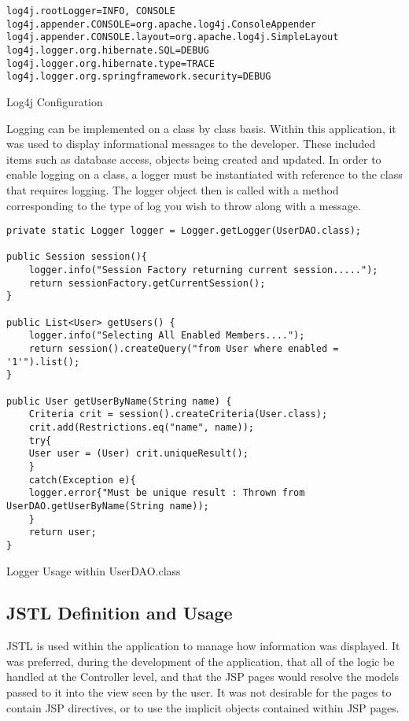 \begin{table}[H]
\begin{lstlisting}
log4j.rootLogger=INFO, CONSOLE
log4j.appender.CONSOLE=org.apache.log4j.ConsoleAppender
log4j.appender.CONSOLE.layout=org.apache.log4j.SimpleLayout
log4j.logger.org.hibernate.SQL=DEBUG
log4j.logger.org.hibernate.type=TRACE
log4j.logger.org.springframework.security=DEBUG
\end{lstlisting}
\caption{Log4j Configuration}
\end{table}

Logging can be implemented on a class by class basis. Within this application, it was used to display informational messages to the developer. These included items such as database access, objects being created and updated. In order to enable logging on a class, a logger must be instantiated with reference to the class that requires logging. The logger object then is called with a method corresponding to the type of log you wish to throw along with a message.

\begin{table}[H]
\begin{lstlisting}
private static Logger logger = Logger.getLogger(UserDAO.class);

public Session session(){ 
	logger.info("Session Factory returning current session.....");
	return sessionFactory.getCurrentSession();
}

public List<User> getUsers() {
	logger.info("Selecting All Enabled Members....");
	return session().createQuery("from User where enabled = '1'").list();
}

public User getUserByName(String name) {
	Criteria crit = session().createCriteria(User.class);
	crit.add(Restrictions.eq("name", name)); 
	try{
	User user = (User) crit.uniqueResult();
	}
	catch(Exception e){
	logger.error{"Must be unique result : Thrown from UserDAO.getUserByName(String name));
	}
	return user;
}
\end{lstlisting}
\caption{Logger Usage within UserDAO.class}
\end{table}


\subsection{JSTL Definition and Usage}

JSTL is used within the application to manage how information was displayed. It was preferred, during the development of the application, that all of the logic be handled at the Controller level, and that the JSP pages would resolve the models passed to it into the view seen by the user. It was not desirable for the pages to contain JSP directives, or to use the implicit objects contained within JSP pages. 

